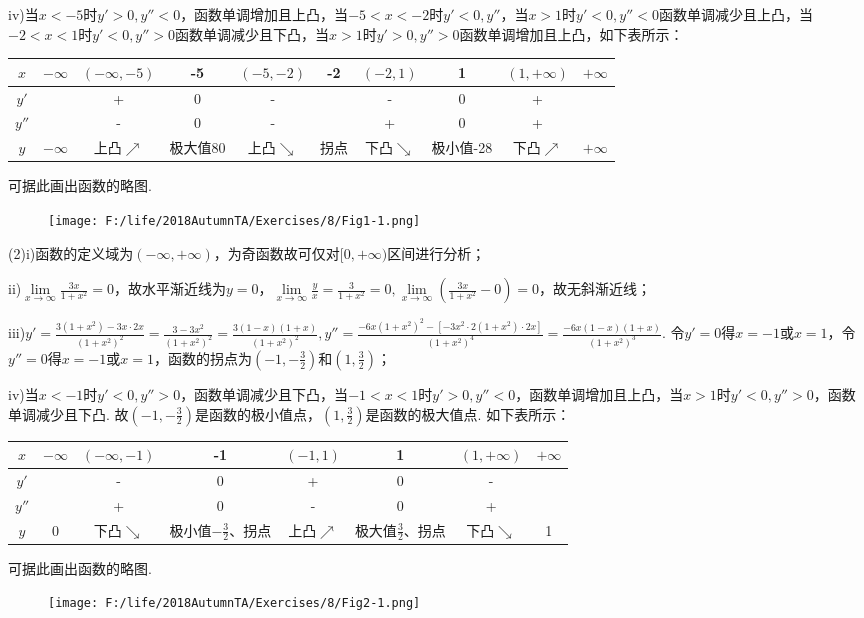 \documentclass[12pt,UTF8]{ctexart}
\begin{document}
\begin{enumerate}
iv)当$x<-5$时$y'>0,y''<0$，函数单调增加且上凸，当$-5<x<-2$时$y'<0,y''$，当$x>1$时$y'<0,y''<0$函数单调减少且上凸，当$-2<x<1$时$y'<0,y''>0$函数单调减少且下凸，当$x>1$时$y'>0,y''>0$函数单调增加且上凸，如下表所示：
\begin{table}[H]
\centering
\begin{tabular}{c|c|c|c|c|c|c|c|c|c}
\hline
$x$ & $-\infty$ & $(-\infty,-5)$ & -5 & $(-5,-2)$ & -2 & $(-2,1)$ & 1 & $(1,+\infty)$ & $+\infty$\\
\hline
$y'$ & & + & 0 & - &  & - & 0 & + &\\
\hline
$y''$ & & - & 0 & - &  & + & 0 & + &\\
\hline
$y$ & $-\infty$ & 上凸$\nearrow$ & 极大值80 & 上凸$\searrow$ & 拐点 & 下凸$\searrow$ & 极小值-28 & 下凸$\nearrow$ & $+\infty$\\
\hline
\end{tabular}
\end{table}
可据此画出函数的略图.
\begin{figure}[H]
\begin{center}
\texttt{[image: F:/life/2018AutumnTA/Exercises/8/Fig1-1.png]}
\end{center}
\end{figure}

(2)i)函数的定义域为$(-\infty,+\infty)$，为奇函数故可仅对$[0,+\infty)$区间进行分析；

ii)$\lim\limits_{x\rightarrow\infty}\frac{3x}{1+x^2}=0$，故水平渐近线为$y=0$，$\lim\limits_{x\rightarrow\infty}\frac yx=\frac{3}{1+x^2}=0,\lim\limits_{x\rightarrow\infty}(\frac{3x}{1+x^2}-0)=0$，故无斜渐近线；

iii)$y'=\frac{3(1+x^2)-3x\cdot2x}{(1+x^2)^2}=\frac{3-3x^2}{(1+x^2)^2}=\frac{3(1-x)(1+x)}{(1+x^2)^2},y''=\frac{-6x(1+x^2)^2-[-3x^2\cdot2(1+x^2)\cdot2x]}{(1+x^2)^4}=\frac{-6x(1-x)(1+x)}{(1+x^2)^3}$. 令$y'=0$得$x=-1$或$x=1$，令$y''=0$得$x=-1$或$x=1$，函数的拐点为$(-1,-\frac32)$和$(1,\frac32)$；

iv)当$x<-1$时$y'<0,y''>0$，函数单调减少且下凸，当$-1<x<1$时$y'>0,y''<0$，函数单调增加且上凸，当$x>1$时$y'<0,y''>0$，函数单调减少且下凸. 故$(-1,-\frac32)$是函数的极小值点，$(1,\frac32)$是函数的极大值点. 如下表所示：
\begin{table}[H]
\centering
\begin{tabular}{c|c|c|c|c|c|c|c}
\hline
$x$ & $-\infty$ & $(-\infty,-1)$ & -1 & $(-1,1)$ & 1 & $(1,+\infty)$ & $+\infty$\\
\hline
$y'$ & & - & 0 & + & 0 & - &\\
\hline
$y''$ & & + & 0 & - & 0 & + & \\
\hline
$y$ & 0 & 下凸$\searrow$ & 极小值$-\frac32$、拐点 & 上凸$\nearrow$ & 极大值$\frac32$、拐点 & 下凸$\searrow$ & 1\\
\hline
\end{tabular}
\end{table}
可据此画出函数的略图.
\begin{figure}[H]
\begin{center}
\texttt{[image: F:/life/2018AutumnTA/Exercises/8/Fig2-1.png]}
\end{center}
\end{figure}


\end{enumerate}
\end{document}
